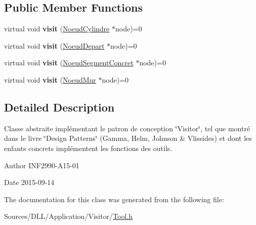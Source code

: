 \subsection*{Public Member Functions}
\begin{DoxyCompactItemize}
\item 
\hypertarget{class_tool_aae0deb2f98f4950c62a72d43f2b5e329}{}virtual void {\bfseries visit} (\hyperlink{class_noeud_cylindre}{Noeud\+Cylindre} $\ast$node)=0\label{class_tool_aae0deb2f98f4950c62a72d43f2b5e329}

\item 
\hypertarget{class_tool_ac2ff46411a7d46e2ee460dd392be2129}{}virtual void {\bfseries visit} (\hyperlink{class_noeud_depart}{Noeud\+Depart} $\ast$node)=0\label{class_tool_ac2ff46411a7d46e2ee460dd392be2129}

\item 
\hypertarget{class_tool_a80ac4596158237b53ec9f54af39f447c}{}virtual void {\bfseries visit} (\hyperlink{class_noeud_segment_concret}{Noeud\+Segment\+Concret} $\ast$node)=0\label{class_tool_a80ac4596158237b53ec9f54af39f447c}

\item 
\hypertarget{class_tool_afadb5dbece885b62cb43db48e8d89408}{}virtual void {\bfseries visit} (\hyperlink{class_noeud_mur}{Noeud\+Mur} $\ast$node)=0\label{class_tool_afadb5dbece885b62cb43db48e8d89408}

\end{DoxyCompactItemize}


\subsection{Detailed Description}
Classe abstraite implémentant le patron de conception \char`\"{}\+Visitor\char`\"{}, tel que montré dans le livre \char`\"{}\+Design Patterns\char`\"{} (Gamma, Helm, Johnson \& Vlissides) et dont les enfants concrets implémentent les fonctions des outils. 

\begin{DoxyAuthor}{Author}
I\+N\+F2990-\/\+A15-\/01 
\end{DoxyAuthor}
\begin{DoxyDate}{Date}
2015-\/09-\/14 
\end{DoxyDate}


The documentation for this class was generated from the following file\+:\begin{DoxyCompactItemize}
\item 
Sources/\+D\+L\+L/\+Application/\+Visitor/\hyperlink{_tool_8h}{Tool.\+h}\end{DoxyCompactItemize}
